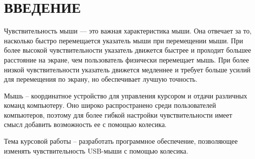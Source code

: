 \chapter*{ВВЕДЕНИЕ}

Чувствительность мыши --- это важная характеристика мыши. Она отвечает за то, насколько быстро перемещается указатель мыши при перемещении мыши. При более высокой чувствительности указатель движется быстрее и проходит большее расстояние на экране, чем пользователь физически перемещает мышь. При более низкой чувствительности указатель движется медленнее и требует больше усилий для перемещения по экрану, но обеспечивает лучшую точность. 

Мышь -- координатное устройство для управления курсором и отдачи различных команд компьютеру.
Оно широко распространено среди пользователей компьютеров, поэтому для более гибкой настройки чувствительности имеет смысл добавить возможность ее с помощью колесика.

Тема курсовой работы -- разработать программное обеспечение, позволяющее изменять чувствительность USB-мыши с помощью колесика.